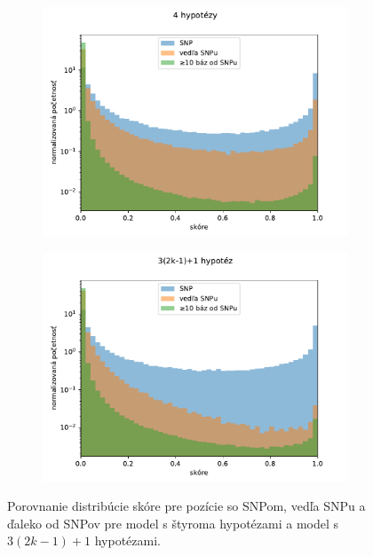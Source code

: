 \begin{figure}[t]
\begin{subfigure}{0.5\textwidth}
\centerline{\includegraphics[width=\linewidth]{plots/1_windowed_titled_eqbins}}
\end{subfigure}%
\begin{subfigure}{0.5\textwidth}
\centerline{\includegraphics[width=\linewidth]{plots/1_moving_eqbins}}
\end{subfigure}
\caption{Porovnanie distribúcie skóre pre pozície so SNPom, vedľa SNPu a ďaleko od SNPov pre model s štyroma hypotézami
a model s $3(2k-1)+1$ hypotézami.}
\label{fig:proximity}
\end{figure}



